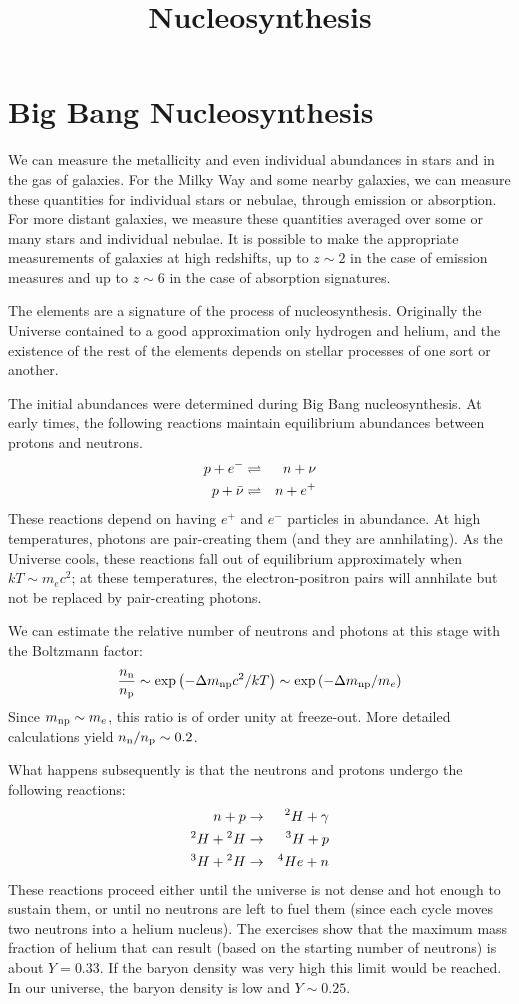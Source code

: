 \title{\bf Nucleosynthesis}

\section{Big Bang Nucleosynthesis}

We can measure the metallicity and even individual abundances in stars
and in the gas of galaxies. For the Milky Way and some nearby
galaxies, we can measure these quantities for individual stars or
nebulae, through emission or absorption. For more distant galaxies, we
measure these quantities averaged over some or many stars and
individual nebulae. It is possible to make the appropriate
measurements of galaxies at high redshifts, up to $z\sim 2$ in the
case of emission measures and up to $z\sim 6$ in the case of
absorption signatures.

The elements are a signature of the process of
nucleosynthesis. Originally the Universe contained to a good
approximation only hydrogen and helium, and the existence of the rest
of the elements depends on stellar processes of one sort or another.

The initial abundances were determined during Big Bang
nucleosynthesis. At early times, the following reactions maintain
equilibrium abundances between protons and neutrons. 
\begin{eqnarray}
p + e^- &\rightleftharpoons& n + \nu \cr
p + \bar\nu &\rightleftharpoons& n + e^+ \cr
\end{eqnarray}
These reactions depend on having $e^+$ and $e^-$ particles in
abundance. At high temperatures, photons are pair-creating them (and
they are annhilating). As the Universe cools, these reactions fall out
of equilibrium approximately when $kT \sim m_e c^2$; at these
temperatures, the electron-positron pairs will annhilate but not be
replaced by pair-creating photons.

We can estimate the relative number of neutrons and photons at this
stage with the Boltzmann factor:
\begin{equation}
\frac{n_{\rm n}}{n_{\rm p}} \sim \exp\left(-\Delta m_{\rm np} c^2 / kT\right) \sim
\exp\left(-\Delta m_{\rm np} / m_e\right)
\end{equation}
Since $m_{\rm np} \sim m_e$, this ratio is of order unity at
freeze-out. More detailed calculations yield $n_{\rm n}/n_{\rm p} \sim
0.2$.

What happens subsequently is that the neutrons and protons undergo the
following reactions:
\begin{eqnarray}
n + p &\rightarrow& {}^2H + \gamma \cr
{}^2H + {}^2H &\rightarrow& {}^3H + p \cr
{}^3H + {}^2H &\rightarrow& {}^4He + n
\end{eqnarray}
These reactions proceed either until the universe is not dense and hot
enough to sustain them, or until no neutrons are left to fuel them
(since each cycle moves two neutrons into a helium nucleus). The
exercises show that the maximum mass fraction of helium that can
result (based on the starting number of neutrons) is about $Y=0.33$.
If the baryon density was very high this limit would be reached. In
our universe, the baryon density is low and $Y\sim 0.25$.

